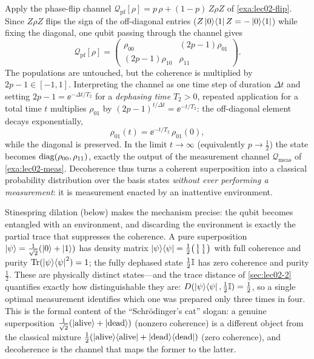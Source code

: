 \begin{example}\label{exa:lec02-dephase}
Apply the phase-flip channel $\mathcal{Q}_{\mathrm{pf}}[\rho]=p\,\rho+(1-p)\,Z\rho Z$
of \cref{exa:lec02-flip}. Since $Z\rho Z$ flips the sign of the off-diagonal entries
($Z\ket{0}\!\bra{1}Z=-\ket{0}\!\bra{1}$) while fixing the diagonal, one qubit passing
through the channel gives
\[
  \mathcal{Q}_{\mathrm{pf}}[\rho]
   =\begin{pmatrix}\rho_{00}&(2p-1)\rho_{01}\\ (2p-1)\rho_{10}&\rho_{11}\end{pmatrix}.
\]
The populations are untouched, but the coherence is multiplied by $2p-1\in[-1,1]$.
Interpreting the channel as one time step of duration $\Delta t$ and setting
$2p-1=\ee^{-\Delta t/T_2}$ for a \emph{dephasing time} $T_2>0$, repeated application
for a total time $t$ multiplies $\rho_{01}$ by $(2p-1)^{t/\Delta t}=\ee^{-t/T_2}$:
the off-diagonal element decays exponentially,
\begin{equation}\label{eq:lec02-dephase}
  \rho_{01}(t)=\ee^{-t/T_2}\,\rho_{01}(0),
\end{equation}
while the diagonal is preserved. In the limit $t\to\infty$ (equivalently $p\to\tfrac12$)
the state becomes $\operatorname{diag}(\rho_{00},\rho_{11})$, exactly the output of the measurement
channel $\mathcal{Q}_{\mathrm{meas}}$ of \cref{exa:lec02-meas}. Decoherence thus turns
a coherent superposition into a classical probability distribution over the basis
states \emph{without ever performing a measurement}: it is measurement enacted by an
inattentive environment.
\end{example}

Stinespring dilation (below) makes the mechanism precise: the qubit becomes entangled
with an environment, and discarding the environment is exactly the partial trace that
suppresses the coherence. A pure superposition
$\ket{\psi}=\tfrac{1}{\sqrt2}(\ket{0}+\ket{1})$ has density matrix
$\ket{\psi}\!\bra{\psi}=\tfrac12\bigl(\begin{smallmatrix}1&1\\1&1\end{smallmatrix}\bigr)$
with full coherence and purity $\operatorname{Tr}(\ket{\psi}\!\bra{\psi}^{2})=1$; the fully dephased state
$\tfrac12\mathbb{I}$ has zero coherence and purity $\tfrac12$. These are physically distinct
states---and the trace distance of \cref{sec:lec02-2} quantifies exactly how
distinguishable they are: $D(\ket{\psi}\!\bra{\psi},\tfrac12\mathbb{I})=\tfrac12$, so a single optimal
measurement identifies which one was prepared only three times in four. This is the
formal content of the ``Schr\"odinger's cat'' slogan: a genuine superposition
$\tfrac{1}{\sqrt2}(\ket{\text{alive}}+\ket{\text{dead}})$ (nonzero coherence) is a
different object from the classical mixture $\tfrac12(\ket{\text{alive}}\!\bra{\text{alive}}+\ket{\text{dead}}\!\bra{\text{dead}})$
(zero coherence), and decoherence is the channel that maps the former to the latter.

